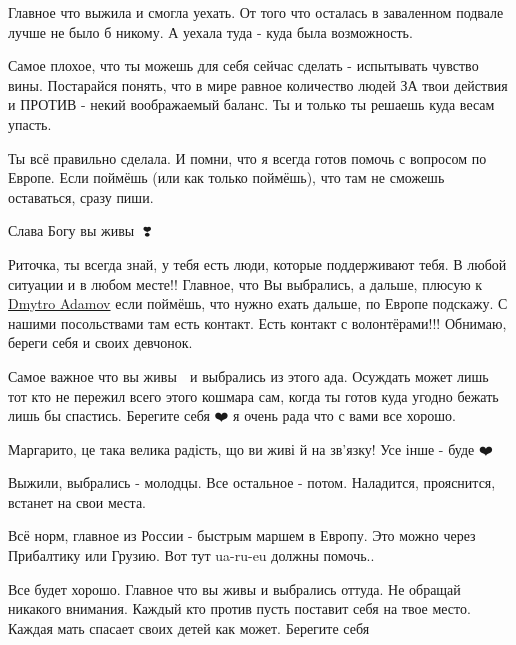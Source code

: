 
Главное что выжила и смогла уехать. От того что осталась в заваленном подвале
лучше не было б никому. А уехала туда - куда была возможность.


Самое плохое, что ты можешь для себя сейчас сделать - испытывать чувство вины.
Постарайся понять, что в мире равное количество людей ЗА твои действия и ПРОТИВ
- некий воображаемый баланс. Ты и только ты решаешь куда весам упасть.

Ты всё правильно сделала. И помни, что я всегда готов помочь с вопросом по
Европе. Если поймёшь (или как только поймёшь), что там не сможешь оставаться,
сразу пиши.


Слава Богу вы живы 🙏❣️


Риточка, ты всегда знай, у тебя есть люди, которые поддерживают тебя. В любой
ситуации и в любом месте!! Главное, что Вы выбрались, а дальше, плюсую к
\href{https://www.facebook.com/adamov.d}{Dmytro Adamov} если поймёшь, что нужно
ехать дальше, по Европе подскажу. С нашими посольствами там есть контакт. Есть
контакт с волонтёрами!!! Обнимаю, береги себя и своих девчонок.


Самое важное что вы живы 🙏 и выбрались из этого ада. Осуждать может лишь тот
кто не пережил всего этого кошмара сам, когда ты готов куда угодно бежать лишь
бы спастись. Берегите себя ❤️ я очень рада что с вами все хорошо.


Маргарито, це така велика радість, що ви живі й на зв'язку! Усе інше - буде ❤️


Выжили, выбрались - молодцы. Все остальное - потом. Наладится, прояснится, встанет на свои места.


Всё норм, главное из России - быстрым маршем в Европу. Это можно через
Прибалтику или Грузию. Вот тут ua-ru-eu должны помочь..


Все будет хорошо. Главное что вы живы и выбрались оттуда. Не обращай никакого
внимания. Каждый кто против пусть поставит себя на твое место. Каждая мать
спасает своих детей как может. Берегите себя

